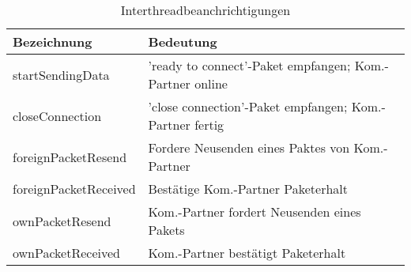 \begin{table}[H]
    \center
    \def\arraystretch{1.3}
    \begin{tabular}{|l|l|}
        \rowcolor{gray!50}
        \hline
        \textbf{Bezeichnung}  & \textbf{Bedeutung}                                      \\
        \hline
        startSendingData      & 'ready to connect'-Paket empfangen; Kom.-Partner online \\
        closeConnection       & 'close connection'-Paket empfangen; Kom.-Partner fertig \\
        foreignPacketResend   & Fordere Neusenden eines Paktes von Kom.-Partner         \\
        foreignPacketReceived & Bestätige Kom.-Partner  Paketerhalt                     \\
        ownPacketResend       & Kom.-Partner fordert Neusenden eines Pakets             \\
        ownPacketReceived     & Kom.-Partner bestätigt Paketerhalt                      \\
        \hline
    \end{tabular}
    \caption{Interthreadbeanchrichtigungen}
    \label{tab:benachrichtigungen}
\end{table}